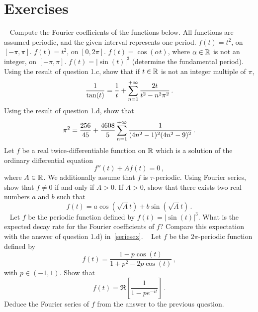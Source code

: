 \section{Exercises}
\begin{ExerciseList}
  \Exercise[label=seriesex]~
  \Question Compute the Fourier coefficients of the functions below. All functions are assumed periodic, and the given interval represents one period.
  \subQuestion $f(t)=t^2$, on $[-\pi,\pi]$.
  \subQuestion $f(t)=t^2$, on $[0,2\pi]$.
  \subQuestion $f(t)=\cos(\alpha t)$, where $\alpha\in\mathbb{R}$ is not an integer, on $[-\pi,\pi]$.
  \subQuestion $f(t)=|\sin(t)|^3$ (determine the fundamental period).
  \Question Using the result of question 1.c, show that if $t\in\mathbb{R}$ is not an integer multiple of $\pi$,
  \begin{equation}
    \frac{1}{\tan(t)}=\frac{1}{t}+\sum_{n=1}^{+\infty}\frac{2t}{t^2-n^2\pi^2}\,.\label{eq:cotan-sing}
  \end{equation}
  \Question Using the result of question 1.d, show that
  \begin{equation}
    \pi^2=\frac{256}{45}+\frac{4608}{5}\sum_{n=1}^{+\infty}\frac{1}{(4n^2-1)^2(4n^2-9)^2}\,.\label{eq:hard-pi2}
  \end{equation}
  \Exercise[label=fourierode2] Let $f$ be a real twice-differentiable function on $\mathbb{R}$ which is
  a solution of the ordinary differential equation
  \begin{equation}
    f''(t) + A f(t) = 0\,,
  \end{equation}
  where $A\in\mathbb{R}$. We additionally assume that $f$ is $\tau$-periodic.
  \Question Using Fourier series, show that $f\neq 0$ if and only if $A>0$.
  \Question If $A>0$, show that there exists two real numbers $a$ and $b$
  such that
  \begin{equation}
    f(t)=a\cos(\sqrt{A} t)+b\sin(\sqrt{A} t)\,.
  \end{equation}
  \Exercise[label=seriesdecay]~
  Let $f$ be the periodic function defined by $f(t)=|\sin(t)|^3$. What is the expected
  decay rate for the Fourier coefficients of $f$? Compare this expectation with the
answer of question 1.d) in~\cref{seriesex}.
\Exercise[label=seriessmooth]~
Let $f$ be the $2\pi$-periodic function defined by
\begin{equation}
  f(t)=\frac{1-p\cos(t)}{1+p^2-2p\cos(t)}\,,
\end{equation}
with $p\in(-1,1)$.
\Question Show that
\begin{equation}
  f(t)=\Re\left[\frac{1}{1-pe^{-it}}\right]\,.
\end{equation}
\Question Deduce the Fourier series of $f$ from the answer to the previous question.
\pagebreak
{}
\end{ExerciseList}
